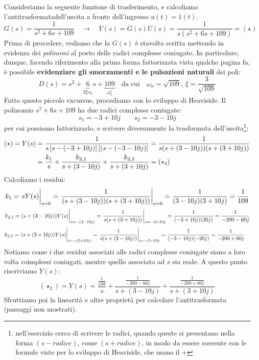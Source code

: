 \begin{esem}
Consideriamo la seguente funzione di trasferimento, e calcoliamo l'antitrasformatadell'uscita a fronte dell'ingresso $u(t) = 1(t)$.
\begin{equation*}
G(s) = \frac{1}{s^2+6s+109} \quad \rightarrow \quad Y(s) = G(s) U(s) = \frac{1}{s(s^2+6s+109)} = (\star)
\end{equation*}
Prima di procedere, vediamo che la $G(s)$ è stavolta scritta mettendo in evidenza dei \textit{polinomi} al posto delle radici complesse coniugate. In particolare, dunque, facendo riferimento alla prima forma fattorizzata vista qualche pagina fa, è possibile \textbf{evidenziare gli smorzamenti e le pulsazioni naturali} dei poli:
\begin{equation*}
D(s) = s^2 + \underbrace{6}_{2\xi \omega_n}s + \underbrace{109}_{\omega_n^2} \quad \textrm{da cui} \quad \omega_n = \sqrt{109}, \ \xi = \frac{3}{\sqrt{109}}
\end{equation*}
Fatto questo piccolo excursus, procediamo con lo sviluppo di Heaviside. Il polinomio $s^2 + 6s + 109$ ha due radici complesse coniugate:
\begin{equation*}
s_1=-3+10j \quad \quad s_2=-3-10j
\end{equation*}
per cui possiamo fattorizzarlo, e scrivere diversamente la trasformata dell'uscita\footnote{nell'esercizio cerco di scrivere le radici, quando queste si presentano nella forma $(s-radice)$, come $(s+radice)$, in modo da essere coerente con le formule viste per lo sviluppo di Heaviside, che usano il $+$}:
\begin{align*}
(\star) = Y(s) & = \frac{1}{s\left[ s-(-3+10j) \right]\left[ (s-(-3-10j) \right]} = \frac{1}{s(s+(3-10j))(s+(3+10j))} \\ & =\frac{k_1}{s} + \frac{k_{2,1}}{s+(3-10j)} +\frac{k_{2,2}}{s+(3+10j)} = (\star_2)
\end{align*}
Calcoliamo i residui:
\begin{equation*}
k_1 = \eval{sY(s)}_{s=0} = \eval{\frac{1}{(s+(3-10j))(s+(3+10j))}}_{s=0} = \frac{1}{(3-10j)(3+10j)} = \frac{1}{109}
\end{equation*}
\begin{align*}
\eval{k_{2,1} = (s+(3-10j))Y(s)}_{s=-(3-10j)} = \eval{\frac{1}{s(s+(3+10j))}}_{s=-3+10j} = \frac{1}{(-3+10j)(20j)} = \frac{1}{-200-60j}
\end{align*}
\begin{align*}
k_{2,2} & = \eval{(s+(3+10j))Y(s)}_{s=-(3+10j)} = \eval{\frac{1}{s(s+(3-10j))}}_{s=-3-10j} = \frac{1}{(-3-10j)(-20j)} = \frac{1}{-200+60j}
\end{align*}
Notiamo come i due residui associati alle radici complesse coniugate siano a loro volta coimplessi coniugati, mentre quello associato ad $s$ sia reale. A questo punto riscriviamo $Y(s)$:
\begin{equation*}
(\star_2) = Y(s) = \frac{\frac{1}{109}}{s} + \frac{\frac{1}{-200-60j}}{s+(3-10j)} +\frac{\frac{1}{-200+60j}}{s+(3+10j)}
\end{equation*}
Sfruttiamo poi la linearità e altre proprietà per calcolare l'antitrasformata (passaggi non mostrati).
\end{esem}











